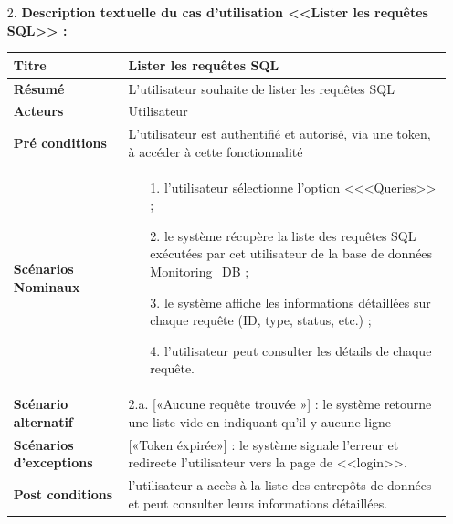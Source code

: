 \begin{enumerate}
\begin{table}[H]
            \caption{description textuelle de cas d'utilisation <<Lister les entrepôts de données>>}
        \end{table}
        \newpage
        \vspace{2cm}
        \item[2.] \textbf{Description textuelle du cas d'utilisation <<Lister les requêtes SQL>> :}
    \begin{table}[H]
        \centering
            \begin{tabular}{|p{3.5cm}|p{12cm}|}
                \hline \textbf{Titre} &  Lister les requêtes SQL \\
                \hline \textbf{Résumé} & L'utilisateur souhaite de lister les requêtes SQL\\
                \hline \textbf{Acteurs} & Utilisateur \\
                \hline \textbf{Pré conditions }& L'utilisateur est authentifié et autorisé, via une token, à accéder à cette fonctionnalité\\
                \hline \textbf{Scénarios Nominaux} &
                    \begin{enumerate}
                        \item [1.] l'utilisateur sélectionne l'option <<<Queries>> ;
                        \item [2.] le système récupère la liste des requêtes SQL exécutées par cet utilisateur de la base de données Monitoring\_DB ;
                        \item [3.] le système affiche les informations détaillées sur chaque requête (ID, type, status, etc.) ;
                        \item [4.] l'utilisateur peut consulter les détails de chaque requête.      
                    \end{enumerate}\\
                        \hline \textbf{Scénario alternatif} & 
                            2.a. \hspace{0.3cm} [«Aucune requête trouvée »] : le système retourne une liste vide en indiquant qu'il y aucune ligne\\
                \hline  \textbf{Scénarios d'exceptions} & 
                  [«Token éxpirée»] : le système signale l'erreur et redirecte l'utilisateur vers la page de <<login>>.\\
                \hline \textbf{Post conditions} & l'utilisateur a accès à la liste des entrepôts de données et peut consulter leurs informations détaillées.\\

\end{tabular}
\end{table}
\end{enumerate}
